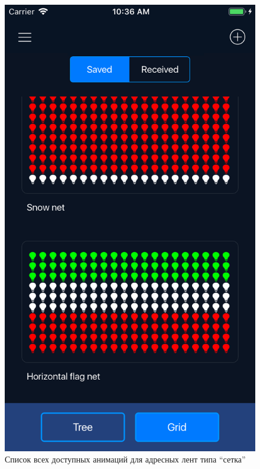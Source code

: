 ~
\begin{figure}[H]
\centering
	\includegraphics[scale=0.2]{figures/userGuide/mainGrid.png}
	\caption{Список всех доступных анимаций для адресных лент типа \enquote{сетка}}
	\label{fig:develop:userGuide:mainGrid}
\end{figure}

